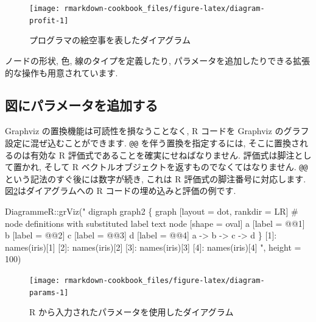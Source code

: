 \documentclass[
  11pt,
  lualatex,
  ja=standard]{bxjsreport}
\newenvironment{Shaded}{\begin{snugshade}}{\end{snugshade}}
\newcommand{\AttributeTok}[1]{\textcolor[rgb]{0.77,0.63,0.00}{#1}}
\newcommand{\DecValTok}[1]{\textcolor[rgb]{0.00,0.00,0.81}{#1}}
\newcommand{\FunctionTok}[1]{\textcolor[rgb]{0.00,0.00,0.00}{#1}}
\newcommand{\NormalTok}[1]{#1}
\newcommand{\SpecialCharTok}[1]{\textcolor[rgb]{0.00,0.00,0.00}{#1}}
\newcommand{\StringTok}[1]{\textcolor[rgb]{0.31,0.60,0.02}{#1}}
\begin{document}
\begin{figure}

{\centering \texttt{[image: rmarkdown-cookbook\_files/figure-latex/diagram-profit-1]} 

}

\caption{プログラマの絵空事を表したダイアグラム}\label{fig:diagram-profit}
\end{figure}

ノードの形状, 色, 線のタイプを定義したり, パラメータを追加したりできる拡張的な操作も用意されています.

\hypertarget{adding-parameters-to-plots}{%
\subsection{図にパラメータを追加する}\label{adding-parameters-to-plots}}

Graphviz の置換機能は可読性を損なうことなく, R コードを Graphviz のグラフ設定に混ぜ込むことができます. \texttt{@@} を伴う置換を指定するには, そこに置換されるのは有効な R 評価式であることを確実にせねばなりません. 評価式は脚注として置かれ, そして R ベクトルオブジェクトを返すものでなくてはなりません. \texttt{@@} という記法のすぐ後には数字が続き, これは R 評価式の脚注番号に対応します. 図\ref{fig:diagram-params}はダイアグラムへの R コードの埋め込みと評価の例です.

\begin{Shaded}
\begin{Highlighting}[numbers=left,,]
\NormalTok{DiagrammeR}\SpecialCharTok{::}\FunctionTok{grViz}\NormalTok{(}\StringTok{"}
\StringTok{  digraph graph2 \{}
\StringTok{  }
\StringTok{  graph [layout = dot, rankdir = LR]}
\StringTok{  }
\StringTok{  \# node definitions with substituted label text}
\StringTok{  node [shape = oval]}
\StringTok{  a [label = \textquotesingle{}@@1\textquotesingle{}]}
\StringTok{  b [label = \textquotesingle{}@@2\textquotesingle{}]}
\StringTok{  c [label = \textquotesingle{}@@3\textquotesingle{}]}
\StringTok{  d [label = \textquotesingle{}@@4\textquotesingle{}]}
\StringTok{  }
\StringTok{  a {-}\textgreater{} b {-}\textgreater{} c {-}\textgreater{} d}
\StringTok{  \}}
\StringTok{  }
\StringTok{  [1]: names(iris)[1]}
\StringTok{  [2]: names(iris)[2]}
\StringTok{  [3]: names(iris)[3]}
\StringTok{  [4]: names(iris)[4]}
\StringTok{  "}\NormalTok{, }
  \AttributeTok{height =} \DecValTok{100}\NormalTok{)}
\end{Highlighting}
\end{Shaded}

\begin{figure}

{\centering \texttt{[image: rmarkdown-cookbook\_files/figure-latex/diagram-params-1]} 

}

\caption{R から入力されたパラメータを使用したダイアグラム}\label{fig:diagram-params}
\end{figure}
\end{document}
